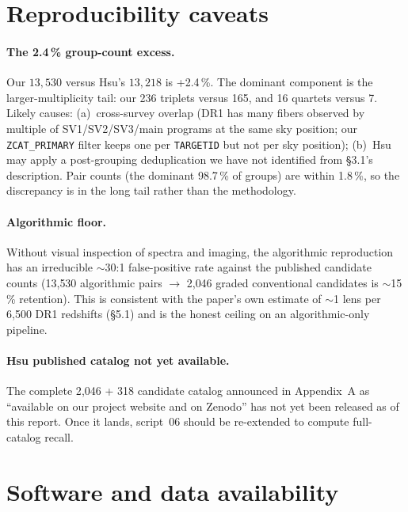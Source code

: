 \documentclass[11pt,letterpaper]{article}
\begin{document}
\section{Reproducibility caveats}

\paragraph{The 2.4\,\% group-count excess.} Our $13{,}530$ versus
Hsu's $13{,}218$ is +2.4\,\%. The dominant component is the
larger-multiplicity tail: our 236 triplets versus 165, and 16 quartets
versus 7. Likely causes: (a)~cross-survey overlap (DR1 has many fibers
observed by multiple of SV1/SV2/SV3/main programs at the same sky
position; our \texttt{ZCAT\_PRIMARY} filter keeps one per
\texttt{TARGETID} but not per sky position); (b)~Hsu may apply a
post-grouping deduplication we have not identified from §3.1's
description. Pair counts (the dominant 98.7\,\% of groups) are within
1.8\,\%, so the discrepancy is in the long tail rather than the
methodology.

\paragraph{Algorithmic floor.} Without visual inspection of spectra and
imaging, the algorithmic reproduction has an irreducible $\sim$30:1
false-positive rate against the published candidate counts (13{,}530
algorithmic pairs $\to$ 2{,}046 graded conventional candidates is
$\sim$15\,\% retention). This is consistent with the paper's own
estimate of $\sim$1 lens per 6{,}500 DR1 redshifts (\S5.1) and is the
honest ceiling on an algorithmic-only pipeline.

\paragraph{Hsu published catalog not yet available.} The complete
2{,}046 + 318 candidate catalog announced in Appendix~A as
``available on our project website and on Zenodo'' has not yet been
released as of this report. Once it lands, script~06 should be
re-extended to compute full-catalog recall.

\section{Software and data availability}
\end{document}
